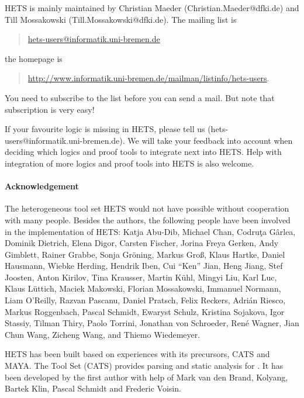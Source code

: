 \documentclass{article}
\newcommand{\normalTEXTSC}[2]{{#1\scriptsize#2}}
\newcommand     {\MAYA}{\normalTEXTSC{M}{AYA}\xspace}
\newcommand     {\Hets}{\normalTEXTSC{H}{ETS}\xspace}
\newcommand     {\Cats}{\normalTEXTSC{C}{ATS}\xspace}
\begin{document}
\Hets is mainly maintained by
Christian Maeder (Christian.Maeder@dfki.de) and Till Mossakowski
(Till.Mossakowski@dfki.de). The mailing list is
\begin{quote}
 \url{hets-users@informatik.uni-bremen.de}
\end{quote}
the homepage is
\begin{quote}
\url{http://www.informatik.uni-bremen.de/mailman/listinfo/hets-users}.
\end{quote}

You need to subscribe to the list before you can send a mail.
But note that subscription is very easy!

If your favourite logic is missing in \Hets, please tell us
(hets-users@informatik.uni-bremen.de). We will take your feedback into account
when deciding which logics and proof tools to integrate next into \Hets. Help
with integration of more logics and proof tools into \Hets is also welcome.

\paragraph{Acknowledgement}
The heterogeneous tool set \Hets would not have possible
without cooperation with many people.
Besides the authors, the following people have been involved
in the implementation of \Hets:
Katja Abu-Dib,
Michael Chan,
Codru\c ta G\^ arlea,
Dominik Dietrich,
Elena Digor,
Carsten Fischer,
Jorina Freya Gerken,
Andy Gimblett,
Rainer Grabbe,
Sonja Gr\"{o}ning,
Markus Groß,
Klaus Hartke,
Daniel Hausmann,
Wiebke Herding,
Hendrik Iben,
Cui ``Ken'' Jian,
Heng Jiang,
Stef Joosten,
Anton Kirilov,
Tina Krausser,
Martin K\"{u}hl,
Mingyi Liu,
Karl Luc,
Klaus L\"{u}ttich,
Maciek Makowski,
Florian Mossakowski,
Immanuel Normann,
Liam O'Reilly,
Razvan Pascanu,
Daniel Pratsch,
Felix Reckers,
Adri\'{a}n Riesco,
Markus Roggenbach,
Pascal Schmidt,
Ewaryst Schulz,
Kristina Sojakova,
Igor Stassiy,
Tilman Thiry,
Paolo Torrini,
Jonathan von Schroeder,
Ren\'{e} Wagner,
Jian Chun Wang,
Zicheng Wang, and
Thiemo Wiedemeyer.

\Hets has been built based on experiences with its
precursors,
                \index{Cats@\Cats}%
\Cats and
                \index{Maya@\MAYA}%
\MAYA.
The \CASL Tool Set (\Cats)
\cite{Mossakowski:2000:CST,Mossakowski:1998:SSA}
provides parsing and static analysis for \CASL.
It has been developed by the first author with help
of Mark van den Brand, Kolyang, Bartek Klin, Pascal Schmidt and
Frederic Voisin.
\end{document}
